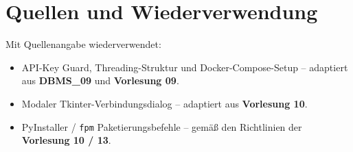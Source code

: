 \documentclass[11pt,a4paper]{article}
\begin{document}
\section*{Quellen und Wiederverwendung}

Mit Quellenangabe wiederverwendet:
\begin{itemize}[leftmargin=1.4em, topsep=2pt]
  \item API-Key Guard, Threading-Struktur und Docker-Compose-Setup -- adaptiert aus \textbf{DBMS\_09} und \textbf{Vorlesung 09}.
  \item Modaler Tkinter-Verbindungsdialog -- adaptiert aus \textbf{Vorlesung 10}.
  \item PyInstaller / \texttt{fpm} Paketierungsbefehle -- gemäß den Richtlinien der \textbf{Vorlesung 10 / 13}.
\end{itemize}
\end{document}

